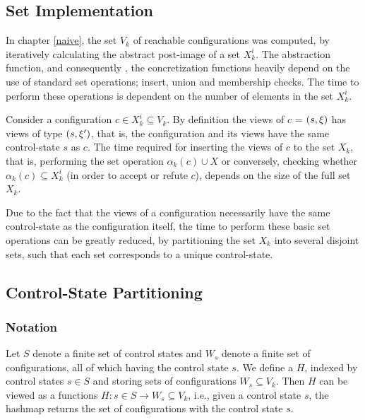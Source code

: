 

\subsection{Set Implementation}
In chapter \ref{naive}, the set $V_k$ of reachable configurations was computed, by iteratively calculating the abstract post-image of a set $X_k^i$. The abstraction function, and consequently , the concretization functions heavily depend on the use of standard set operations; insert, union and membership checks. The time to perform these operations is dependent on the number of elements in the set $X_k^i$.

Consider a configuration $c \in X_k^i \subseteq V_k$. By definition the views of $c$ = $(s, \xi)$ has views of type $(s,\xi')$, that is, the configuration and its views have the same control-state $s$ as $c$. The time required for inserting the views of $c$ to the set $X_k$, that is, performing the set operation $\alpha_k(c) \cup X$ or conversely, checking whether $\alpha_k(c) \subseteq X_k^i$ (in order to accept or refute $c$), depends on the size of the full set $X_k$.

Due to the fact that the views of a configuration necessarily have the same control-state as the configuration itself, the time to perform these basic set operations can be greatly reduced, by partitioning the set $X_k$ into several disjoint sets, such that each set corresponds to a unique control-state.
\subsection{Control-State Partitioning}
\subsubsection{Notation}
Let $S$ denote a finite set of control states and $W_s$ denote a finite set of configurations, all of which having the control state $s$. We define a  $H$, indexed by control states $s \in S$ and storing sets of configurations $W_s \subseteq V_k$. Then $H$ can be viewed as a functions $H : s \in S \rightarrow W_s \subseteq V_k$, i.e., given a control state $s$, the hashmap returns the set of configurations with the control state $s$. 

